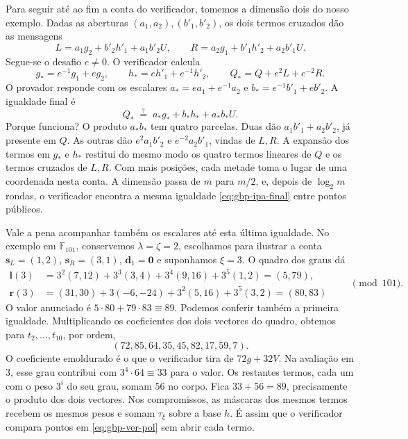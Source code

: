 Para seguir até ao fim a conta do verificador, tomemos a dimensão dois
do nosso exemplo. Dadas as aberturas \((a_1,a_2),(b'_1,b'_2)\),
os dois termos cruzados dão as mensagens
\[
 L=a_1 g_2+b'_2h'_1+a_1b'_2U,\qquad
 R=a_2 g_1+b'_1h'_2+a_2b'_1U.
\]
Segue-se o desafio \(e\ne0\). O verificador calcula
\[
 g_* =e^{-1}g_1+e g_2,\qquad h_*=e h'_1+e^{-1}h'_2,\qquad
 Q_*=Q+e^2 L+e^{-2}R .
\]
O provador responde com os escalares \(a_*=e a_1+e^{-1}a_2\) e
\(b_*=e^{-1}b'_1+e b'_2\). A igualdade final é
\begin{equation}
             Q_*\;\stackrel{?}{=}\;a_* g_*+b_* h_*+a_*b_*U .
 \label{eq:gbp-ipa-final}
\end{equation}
Porque funciona? O produto \(a_*b_*\) tem quatro parcelas. Duas
dão \(a_1b'_1+a_2b'_2\), já presente em \(Q\). As outras dão
\(e^2a_1b'_2\) e \(e^{-2}a_2b'_1\), vindas de \(L,R\).
A expansão dos termos em \(g_*\) e \(h_*\) restitui do mesmo modo
os quatro termos lineares de \(Q\) e os termos cruzados de \(L,R\).
Com mais posições, cada metade toma o lugar de uma coordenada nesta
conta. A dimensão passa de \(m\) para \(m/2\), e, depois de
\(\log_2 m\) rondas, o verificador encontra a mesma igualdade
\eqref{eq:gbp-ipa-final} entre pontos públicos.

Vale a pena acompanhar também os escalares até esta última igualdade.
No exemplo em \(\mathbb F_{101}\), conservemos \(\lambda=\zeta=2\),
escolhamos para ilustrar a conta \(\boldsymbol s_L=(1,2)\),
\(\boldsymbol s_R=(3,1)\), \(\boldsymbol d_1=\boldsymbol0\) e
suponhamos \(\xi=3\). O quadro dos graus dá
\[
 \begin{aligned}
 \boldsymbol l(3)&=3^2(7,12)+3^3(3,4)+3^4(9,16)+3^5(1,2)
                    =(5,79),\\
 \boldsymbol r(3)&=(31,30)+3(-6,-24)+3^2(5,16)+3^5(3,2)
                    =(80,83)
 \end{aligned}
 \qquad\pmod{101}.
\]
O valor anunciado é \(5\cdot80+79\cdot83\equiv89\). Podemos conferir
também a primeira igualdade. Multiplicando os coeficientes dos dois
vectores do quadro, obtemos para \(t_2,\ldots,t_{10}\), por ordem,
\[
 (72,85,\boxed{64},35,45,82,17,59,7).
\]
O coeficiente emoldurado é o que o verificador tira de \(72g+32V\).
Na avaliação em \(3\), esse grau contribui com
\(3^4\cdot64\equiv33\) para o valor. Os restantes termos, cada um
com o peso \(3^i\) do seu grau, somam \(56\) no corpo. Fica
\(33+56=89\), precisamente o produto dos dois vectores. Nos
compromissos, as máscaras dos mesmos termos recebem os mesmos pesos e
somam \(\tau_\xi\) sobre a base \(h\). É assim que o verificador
compara pontos em \eqref{eq:gbp-ver-pol} sem abrir cada termo.

